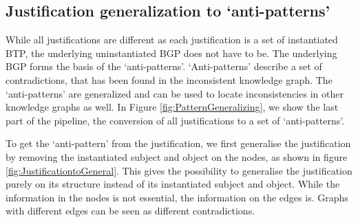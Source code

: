 \documentclass[11pt,letterpaper ,oneside ]{book}
\begin{document}
	\subsection{Justification generalization to `anti-patterns'}
	\begin{figure}[!t]
	\end{figure}
	While all justifications are different as each justification is a set of instantiated BTP, the underlying uninstantiated BGP does not have to be. The underlying BGP forms the basis of the `anti-patterns'. `Anti-patterns' describe a set of contradictions, that has been found in the inconsistent knowledge graph. The `anti-patterns' are generalized and can be used to locate inconsistencies in other knowledge graphs as well. In Figure \ref{fig:PatternGeneralizing}, we show the last part of the pipeline, the conversion of all justifications to a set of `anti-patterns'.
	
	To get the `anti-pattern' from the justification, we first generalise the justification by removing the instantiated subject and object on the nodes, as shown in figure \ref{fig:JustificationtoGeneral}. This gives the possibility to generalise the justification purely on its structure instead of its instantiated subject and object. While the information in the nodes is not essential, the information on the edges is. Graphs with different edges can be seen as different contradictions. \\
	
\end{document}
